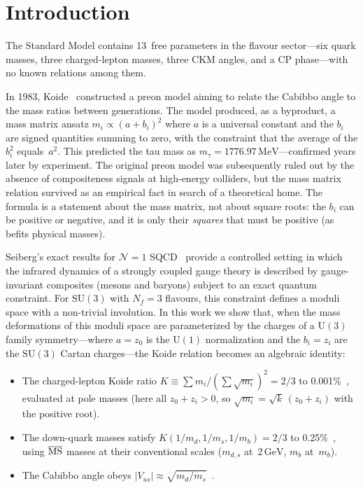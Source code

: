 \documentclass[12pt,a4paper]{article}
\newcommand{\SU}{\mathrm{SU}}
\newcommand{\UU}{\mathrm{U}}
\newcommand{\Nf}{N_f}
\newcommand{\MeV}{\,\mathrm{MeV}}
\newcommand{\GeV}{\,\mathrm{GeV}}
\begin{document}
\section{Introduction}
\label{sec:intro}

The Standard Model contains 13~free parameters in the flavour
sector---six quark masses, three charged-lepton masses, three CKM
angles, and a CP phase---with no known relations among them.

In 1983, Koide~\cite{Koide:1983qe} constructed a preon model
aiming to relate the Cabibbo angle to the mass ratios between
generations. The model produced, as a byproduct, a mass matrix
ansatz $m_i \propto (a + b_i)^2$ where $a$ is a universal constant
and the $b_i$ are signed quantities summing to zero, with the
constraint that the average of the $b_i^2$ equals~$a^2$.
This predicted the tau mass as $m_\tau = 1776.97\MeV$---confirmed
years later by experiment. The original preon model was subsequently
ruled out by the absence of compositeness signals at high-energy
colliders, but the mass matrix relation survived as an empirical
fact in search of a theoretical home.
The formula is a statement about the mass matrix, not about
square roots: the $b_i$ can be positive or negative, and it is
only their \emph{squares} that must be positive (as befits
physical masses).

Seiberg's exact results for $\mathcal{N}=1$
SQCD~\cite{Seiberg:1994bz,Intriligator:1995au} provide a
controlled setting in which the infrared dynamics of a strongly coupled
gauge theory is described by gauge-invariant composites (mesons and
baryons) subject to an exact quantum constraint. For $\SU(3)$ with
$\Nf=3$ flavours, this constraint defines a moduli space with a
non-trivial involution. In this work we show that, when the mass
deformations of this moduli space are parameterized by the charges of a
$\UU(3)$ family symmetry---where $a = z_0$ is the $\UU(1)$
normalization and the $b_i = z_i$ are the $\SU(3)$ Cartan
charges---the Koide relation becomes an algebraic identity:
\begin{itemize}
  \item The charged-lepton Koide ratio $K \equiv \sum m_i / (\sum
    \sqrt{m_i})^2 = 2/3$ to 0.001\%~\cite{Koide:1983qe},
    evaluated at pole masses (here all $z_0 + z_i > 0$, so
    $\sqrt{m_i} = \sqrt{k}\,(z_0{+}z_i)$ with the positive root).
  \item The down-quark masses satisfy $K(1/m_d, 1/m_s, 1/m_b) = 2/3$
    to 0.25\%~\cite{Rivero:2024epjc}, using
    $\overline{\rm MS}$ masses at their conventional scales
    ($m_{d,s}$ at~$2\GeV$, $m_b$ at~$m_b$).
  \item The Cabibbo angle obeys $|V_{us}| \approx
    \sqrt{m_d/m_s}$~\cite{GattoSartoriTonin:1968,Weinberg:1977hb,Fritzsch:1979zq}.
\end{itemize}
\end{document}
